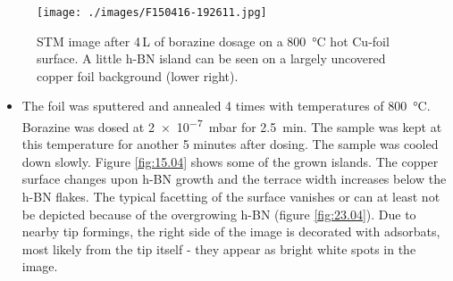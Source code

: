 \begin{figure}
 \centering
 \texttt{[image: ./images/F150416-192611.jpg]}
 \caption{STM image after 4\,L of borazine dosage on a \SI{800}{\degreeCelsius} hot Cu-foil surface. A little h-BN island can be seen on a largely uncovered copper foil background (lower right).}
 \label{fig:16.04}
\end{figure}
% 
\begin{itemize}
 \item The foil was sputtered and annealed 4 times with temperatures of \SI{800}{\degreeCelsius}. Borazine was dosed at \SI{2e-7}{\milli \bar} for \SI{2.5}{\minute}. The sample was kept at this temperature for another 5 minutes after dosing. The sample was cooled down slowly. Figure \ref{fig:15.04} shows some of the grown islands. The copper surface changes upon h-BN growth and the terrace width increases below the h-BN flakes. The typical facetting of the surface vanishes or can at least not be depicted because of the overgrowing h-BN (figure \ref{fig:23.04}). Due to nearby tip formings, the right side of the image is decorated with adsorbats, most likely from the tip itself - they appear as bright white spots in the image.
\end{itemize}
